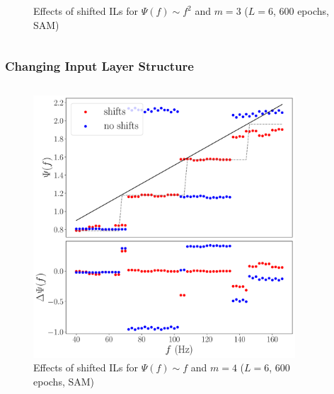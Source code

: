 \documentclass{beamer}
\begin{document}
\begin{frame}
\begin{columns}
\begin{column}{0.5\textwidth}
\begin{figure}
\caption{Effects of shifted ILs for $\Psi(f) \sim f^2$ and $m=3$ ($L=6$, 600 epochs, SAM)}
\end{figure}
\end{column}
\end{columns}
\end{frame}

\begin{frame}
\frametitle{Changing Input Layer Structure}
\begin{columns}
\begin{column}{0.5\textwidth}
\begin{figure}
\centering 
\includegraphics[width=\textwidth]{im/phase_shift_comp_linear_m4}
\caption{Effects of shifted ILs for $\Psi(f) \sim f$ and $m=4$ ($L=6$, 600 epochs, SAM)}
\end{figure}
\end{column}
\begin{column}{0.5\textwidth}
\begin{figure}
\centering 

\end{figure}
\end{column}
\end{columns}
\end{frame}
\end{document}
